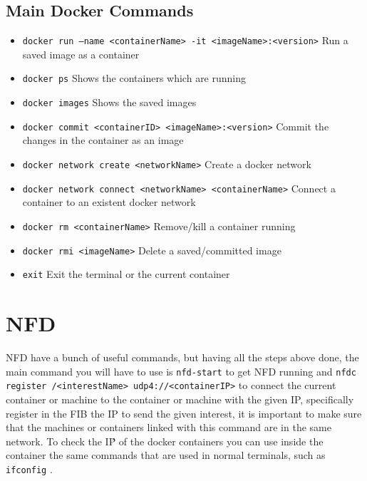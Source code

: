 \documentclass[10pt,letterpaper,extrafontsizes]{memoir}
\begin{document}
\subsection{Main Docker Commands}
\begin{itemize}
 \item \texttt{docker run --name <containerName> -it <imageName>:<version>}
 Run a saved image as a container
 \item \texttt{docker ps}
 Shows the containers which are running
 \item \texttt{docker images}
 Shows the saved images
 \item \texttt{docker commit <containerID>  <imageName>:<version>}
 Commit the changes in the container as an image
 \item \texttt{docker network create <networkName>}
 Create a docker network
 \item \texttt{docker network connect <networkName> <containerName>}
 Connect a container to an existent docker network
 \item \texttt{docker rm <containerName>}
 Remove/kill a container running
 \item \texttt{docker rmi <imageName>}
 Delete a saved/committed image
 \item \texttt{exit} 
 Exit the terminal or the current container
\end{itemize}


\section{NFD}
NFD have a bunch of useful commands, but having all the steps above done, the main command you will have to use is \texttt{nfd-start} to get NFD running and \texttt{nfdc register /<interestName> udp4://<containerIP>} to connect the current container or machine to the container or machine with the given IP, specifically register in the FIB the IP to send the given interest, it is important to make sure that the machines or containers linked with this command are in the same network.
To check the IṔ of the docker containers you can use inside the container the same commands that are used in normal terminals, such as \texttt{ifconfig} .
\end{document}
